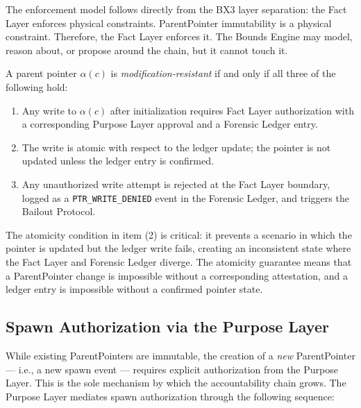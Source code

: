 The enforcement model follows directly from the BX3 layer separation: the Fact Layer enforces physical constraints. ParentPointer immutability is a physical constraint. Therefore, the Fact Layer enforces it. The Bounds Engine may model, reason about, or propose around the chain, but it cannot touch it.

\begin{definition}
\label{def:modification-resistance}
A parent pointer $\alpha(c)$ is \textit{modification-resistant} if and only if all three of the following hold:

\begin{enumerate}[noitemsep]
    \item Any write to $\alpha(c)$ after initialization requires Fact Layer authorization with a corresponding Purpose Layer approval and a Forensic Ledger entry.
    \item The write is atomic with respect to the ledger update; the pointer is not updated unless the ledger entry is confirmed.
    \item Any unauthorized write attempt is rejected at the Fact Layer boundary, logged as a \texttt{PTR\_WRITE\_DENIED} event in the Forensic Ledger, and triggers the Bailout Protocol.
\end{enumerate}
\end{definition}

The atomicity condition in item (2) is critical: it prevents a scenario in which the pointer is updated but the ledger write fails, creating an inconsistent state where the Fact Layer and Forensic Ledger diverge. The atomicity guarantee means that a ParentPointer change is impossible without a corresponding attestation, and a ledger entry is impossible without a confirmed pointer state.

\subsection{Spawn Authorization via the Purpose Layer}

While existing ParentPointers are immutable, the creation of a \textit{new} ParentPointer — i.e., a new spawn event — requires explicit authorization from the Purpose Layer. This is the sole mechanism by which the accountability chain grows. The Purpose Layer mediates spawn authorization through the following sequence:

